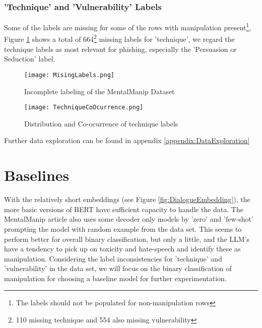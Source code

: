 \documentclass[
	letterpaper, %
	12pt, %
	unnumberedsections, %
	twoside, %
]{LTJournalArticle}
\begin{document}
\subsubsection{'Technique' and 'Vulnerability' Labels}
Some of the labels are missing for some of the rows with manipulation present\footnote{The labels should not be populated for non-manipulation rows}, Figure \ref{fig:MissingLabels} shows a total of 664\footnote{110 missing technique and 554 also missing vulnerability} missing labels for 'technique', we regard the technique labels as most relevant for phishing, especially the 'Persuasion or Seduction' label.
\begin{figure}[!htp] %
	\centering
	\texttt{[image: MisingLabels.png]}
	\caption{Incomplete labeling of the MentalManip Dataset}
	\label{fig:MissingLabels}
\end{figure}


\begin{figure}[!htp] %
	\centering
	\texttt{[image: TechniqueCoOcurrence.png]}
	\caption{Distribution and Co-ocurrence of technique labels}
	\label{fig:TechCoOcurrence}
\end{figure}

Further data exploration can be found in appendix \ref{appendix:DataExploration}




\section{Baselines}
With the relatively short embeddings (see Figure \ref{fig:DialogueEmbedding}), the more basic versions of BERT have sufficient capacity to handle the data. The MentalManip article \cite{MentalManip} also uses some decoder only models by 'zero' and 'few-shot' prompting the model with random example from the data set. This seems to perform better for overall binary classification, but only a little, and the LLM's have a tendency to pick up on toxicity and hate-speech and identify these as manipulation.
Considering the label inconsistencies for 'technique' and 'vulnerability' in the data set, we will focus on the binary classification of manipulation for choosing a baseline model for further experimentation.
\end{document}
